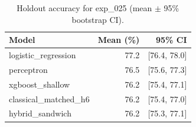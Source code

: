 \begin{table}[ht]
\centering
\caption{Holdout accuracy for exp_025 (mean $\pm$ 95\% bootstrap CI).}
\label{tab:exp_025}
\begin{tabular}{lrr}
\toprule
Model & Mean (\%) & 95\% CI \\
\midrule
logistic\_regression & 77.2 & [76.4, 78.0] \\
perceptron & 76.5 & [75.6, 77.3] \\
xgboost\_shallow & 76.2 & [75.4, 77.1] \\
classical\_matched\_h6 & 76.2 & [75.4, 77.0] \\
hybrid\_sandwich & 76.2 & [75.3, 77.1] \\
\bottomrule
\end{tabular}
\end{table}
